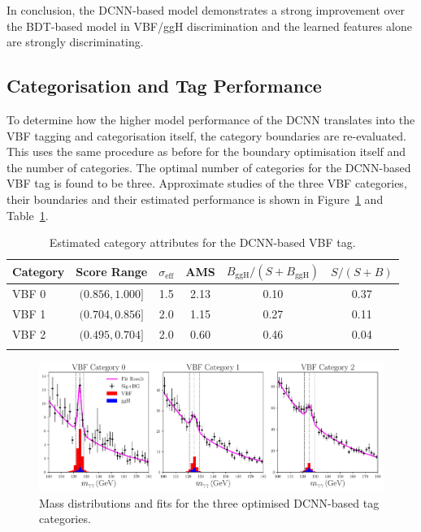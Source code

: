 In conclusion, the DCNN-based model demonstrates a strong improvement over the BDT-based model in VBF/ggH discrimination and the learned features alone are strongly discriminating. 












\subsection{Categorisation and Tag Performance}
To determine how the higher model performance of the DCNN translates into the VBF tagging and categorisation itself, the category boundaries are re-evaluated. 
This uses the same procedure as before for the boundary optimisation itself and the number of categories. 
The optimal number of categories for the DCNN-based VBF tag is found to be three.
Approximate studies of the three VBF categories, their boundaries and their estimated performance is shown in Figure~\ref{fig:event_categorisation:DCNN_mass_fits} and Table~\ref{tab:event_selection:DCNN_cats}.
\begin{table}[h!]
    \centering
    \renewcommand{\arraystretch}{1.3}
    \begin{tabular}{ l | c c c c c }
        \thickhline
        Category & Score Range & $\sigma_{\mathrm{eff}}$ & AMS & $B_{\mathrm{ggH}}/(S+B_{\mathrm{ggH}})$ & $S/(S+B)$ \\
        \hline
        VBF 0 & $(0.856, 1.000]$ & 1.5 &  2.13 & 0.10 & 0.37 \\
        VBF 1 & $(0.704, 0.856]$ & 2.0 &  1.15 & 0.27 & 0.11 \\
        VBF 2 & $(0.495, 0.704]$ & 2.0 &  0.60 & 0.46 & 0.04 \\
        \thickhline
    \end{tabular}
    \caption{Estimated category attributes for the DCNN-based VBF tag.}
    \label{tab:event_selection:DCNN_cats}
\end{table}
\begin{figure}[h!]
    \centering
    \includegraphics[width=1.0\textwidth]{figures/event_selection/DCNN_mass_fits.pdf}
    \caption{Mass distributions and fits for the three optimised DCNN-based tag categories.}
    \label{fig:event_categorisation:DCNN_mass_fits}
\end{figure}

